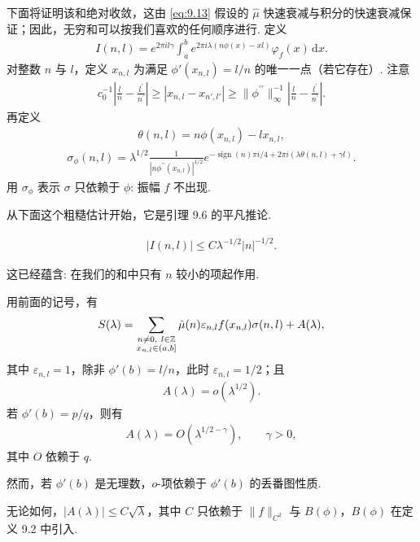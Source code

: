 下面将证明该和绝对收敛，这由 \eqref{eq:9.13} 假设的 $\hat{\mu}$ 快速衰减与积分的快速衰减保证；因此，无穷和可以按我们喜欢的任何顺序进行. 定义
\begin{align*}
  I(n,l)=e^{2\pi i l\gamma}\int_{a}^{b}e^{2\pi i\lambda(n\phi(x)-x l)}\varphi_{f}(x)\,\mathrm{d}x.
\end{align*}
对整数 $n$ 与 $l$，定义 $x_{n,l}$ 为满足 $\phi'(x_{n,l}) = l/n$ 的唯一一点（若它存在）. 注意
\begin{align*}
  c_{0}^{-1}\left|\frac{l}{n}-\frac{l^{\prime}}{n^{\prime}}\right|
  \geq|x_{n,l}-x_{n',l'}|
  \geq\|\phi^{\prime\prime}\|_{\infty}^{-1}\left|\frac{l}{n}-\frac{l^{\prime}}{n^{\prime}}\right|.
\end{align*}
再定义
\begin{align*}
  \theta(n,l)=n\phi(x_{n,l})-l x_{n,l},
\end{align*}
\begin{align*}
  \sigma_{\phi}(n,l)=\lambda^{1/2}\frac{1}{|n\phi^{\prime\prime}(x_{n,l})|^{1/2}}
  e^{-\operatorname{sign}(n)\pi i/4+2\pi i(\lambda\theta(n,l)+\gamma l)}.
\end{align*}
用 $\sigma_{\phi}$ 表示 $\sigma$ 只依赖于 $\phi$: 振幅 $f$ 不出现.

从下面这个粗糙估计开始，它是引理 9.6 的平凡推论.

\begin{lemma}\label{lem:9.7}
\begin{align*}
  |I(n,l)|\leq C\lambda^{-1/2}|n|^{-1/2}.
\end{align*}
\end{lemma}

这已经蕴含: 在我们的和中只有 $n$ 较小的项起作用.

\begin{theorem}\label{thm:9.8}
用前面的记号，有
\begin{align*}
  S(\lambda)=\sum_{\substack{n\neq 0,\ l\in\mathbb{Z}\\ x_{n,l}\in(a,b]}}
  \hat{\mu}(n)\varepsilon_{n,l}f(x_{n,l})\sigma(n,l)+A(\lambda),
\end{align*}
其中 $\varepsilon_{n,l}=1$，除非 $\phi'(b)=l/n$，此时 $\varepsilon_{n,l}=1/2$；且
\begin{align*}
  A(\lambda)=o(\lambda^{1/2}).
\end{align*}
若 $\phi'(b) = p/q$，则有
\begin{align*}
  A(\lambda)=O(\lambda^{1/2-\gamma}),\qquad \gamma>0,
\end{align*}
其中 $O$ 依赖于 $q$.

然而，若 $\phi'(b)$ 是无理数，$o$-项依赖于 $\phi'(b)$ 的丢番图性质.

无论如何，$|A(\lambda)| \leq C\sqrt{\lambda}$，其中 $C$ 只依赖于 $\|f\|_{C^2}$ 与 $B(\phi)$，$B(\phi)$ 在定义 9.2 中引入.
\end{theorem}

